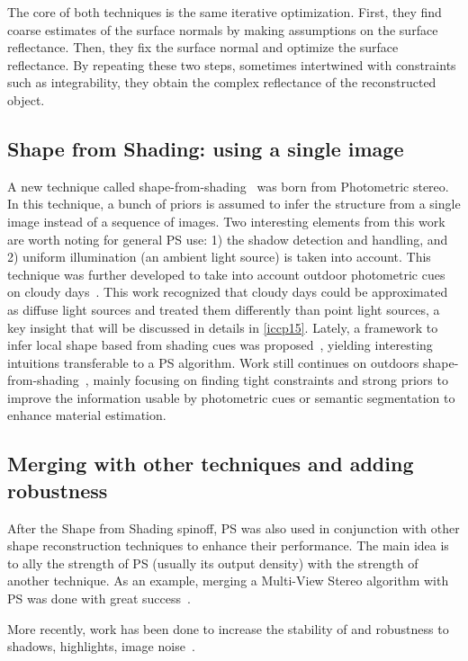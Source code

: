 The core of both techniques is the same iterative optimization. First, they find coarse estimates of the surface normals by making assumptions on the surface reflectance. Then, they fix the surface normal and optimize the surface reflectance. By repeating these two steps, sometimes intertwined with constraints such as integrability, they obtain the complex reflectance of the reconstructed object.

\subsection{Shape from Shading: using a single image}
A new technique called shape-from-shading~\cite{Horn1989} was born from Photometric stereo. In this technique, a bunch of priors is assumed to infer the structure from a single image instead of a sequence of images. Two interesting elements from this work are worth noting for general PS use: 1) the shadow detection and handling, and 2) uniform illumination (an ambient light source) is taken into account. This technique was further developed to take into account outdoor photometric cues on cloudy days~\cite{Langer1994}. This work recognized that cloudy days could be approximated as diffuse light sources and treated them differently than point light sources, a key insight that will be discussed in details in \ref{iccp15}. Lately, a framework to infer local shape based from shading cues was proposed~\cite{Xiong2013}, yielding interesting intuitions transferable to a PS algorithm. Work still continues on outdoors shape-from-shading~\cite{oxholm-eccv-12,johnson-cvpr-11,barron-pami-15}, mainly focusing on finding tight constraints and strong priors to improve the information usable by photometric cues or semantic segmentation to enhance material estimation.

\subsection{Merging with other techniques and adding robustness}
After the Shape from Shading spinoff, PS was also used in conjunction with other shape reconstruction techniques to enhance their performance. The main idea is to ally the strength of PS (usually its output density) with the strength of another technique. As an example, merging a Multi-View Stereo algorithm with PS was done with great success~\cite{HernandezEsteban2008}.

More recently, work has been done to increase the stability of and robustness to shadows, highlights, image noise~\cite{BarskyPetrou-pami-2003,ikehata-cvpr-12,ikehata-cvpr-14}. 

